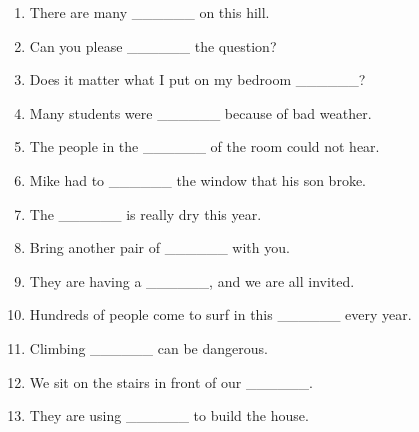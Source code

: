 \documentclass[a4paper,12pt]{article}
\begin{document}
\begin{enumerate}[label=\arabic*.]
    \item There are many \_\_\_\_\_\_ on this hill.
    \item Can you please \_\_\_\_\_\_ the question?
    \item Does it matter what I put on my bedroom \_\_\_\_\_\_?
    \item Many students were \_\_\_\_\_\_ because of bad weather.
    \item The people in the \_\_\_\_\_\_ of the room could not hear.
    \item Mike had to \_\_\_\_\_\_ the window that his son broke.
    \item The \_\_\_\_\_\_ is really dry this year.
    \item Bring another pair of \_\_\_\_\_\_ with you.
    \item They are having a \_\_\_\_\_\_, and we are all invited.
    \item Hundreds of people come to surf in this \_\_\_\_\_\_ every year.
    \item Climbing \_\_\_\_\_\_ can be dangerous.
    \item We sit on the stairs in front of our \_\_\_\_\_\_.
    \item They are using \_\_\_\_\_\_ to build the house.
\end{enumerate}
\end{document}
